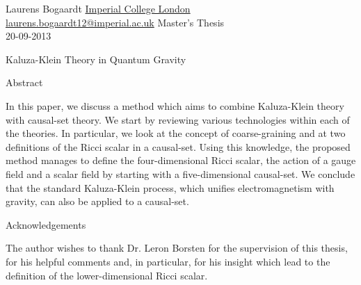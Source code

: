 \documentclass[a4paper,12pt]{article}
\numberwithin{equation}{section}
\begin{document}
\label{sec:Cover Page}

Laurens Bogaardt \hfill \href{http://www.imperial.ac.uk}{Imperial College London}\\
\href{mailto:laurens.bogaardt12@imperial.ac.uk}{laurens.bogaardt12@imperial.ac.uk} \hfill Master's Thesis\\
 \hfill 20-09-2013\\

\vspace{5cm}

\begin{center}
\begin{LARGE}
\begin{bf}
Kaluza-Klein Theory in Quantum Gravity
\end{bf}
\end{LARGE}
\end{center}

\vfill

\begin{center}
\begin{minipage}[t]{0.72\textwidth}
\begin{bf}
Abstract
\end{bf}
\vspace{.2cm}
\newline
In this paper, we discuss a method which aims to combine Kaluza-Klein theory with causal-set theory. We start by reviewing various technologies within each of the theories. In particular, we look at the concept of coarse-graining and at two definitions of the Ricci scalar in a causal-set. Using this knowledge, the proposed method manages to define the four-dimensional Ricci scalar, the action of a gauge field and a scalar field by starting with a five-dimensional causal-set. We conclude that the standard Kaluza-Klein process, which unifies electromagnetism with gravity, can also be applied to a causal-set.
\end{minipage}
\end{center}

\vspace{.6cm}

\begin{center}
\begin{minipage}[t]{0.72\textwidth}
\begin{bf}
Acknowledgements
\end{bf}
\vspace{.2cm}
\newline
The author wishes to thank Dr. Leron Borsten for the supervision of this thesis, for his helpful comments and, in particular, for his insight which lead to the definition of the lower-dimensional Ricci scalar.
\end{minipage}
\end{center}
\end{document}
